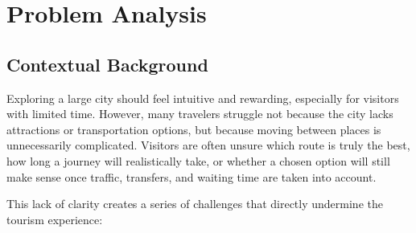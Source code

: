 \chapter{Problem Analysis}

\section{Contextual Background}

Exploring a large city should feel intuitive and rewarding, especially for visitors with limited time. However, many travelers struggle not because the city lacks attractions or transportation options, but because moving between places is unnecessarily complicated. Visitors are often unsure which route is truly the best, how long a journey will realistically take, or whether a chosen option will still make sense once traffic, transfers, and waiting time are taken into account.

This lack of clarity creates a series of challenges that directly undermine the tourism experience:

